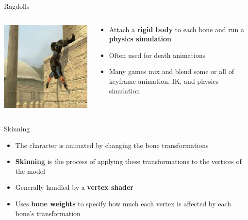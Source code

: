 \begin{frame}{Ragdolls}
	\begin{columns}
		\begin{column}{0.4\textwidth}
			\includegraphics[width=\textwidth]{ragdoll}
		\end{column}
		\begin{column}{0.58\textwidth}
			\begin{itemize}
				\pause\item Attach a \textbf{rigid body} to each bone and run a \textbf{physics simulation}
				\pause\item Often used for death animations
				\pause\item Many games mix and blend some or all of keyframe animation, IK, and physics simulation
			\end{itemize}
		\end{column}
	\end{columns}
\end{frame}

\begin{frame}{Skinning}
	\begin{itemize}
		\pause\item The character is animated by changing the bone transformations
		\pause\item \textbf{Skinning} is the process of applying these transformations to the vertices of the model
		\pause\item Generally handled by a \textbf{vertex shader}
		\pause\item Uses \textbf{bone weights} to specify how much each vertex is affected by each bone's transformation
	\end{itemize}
\end{frame}

